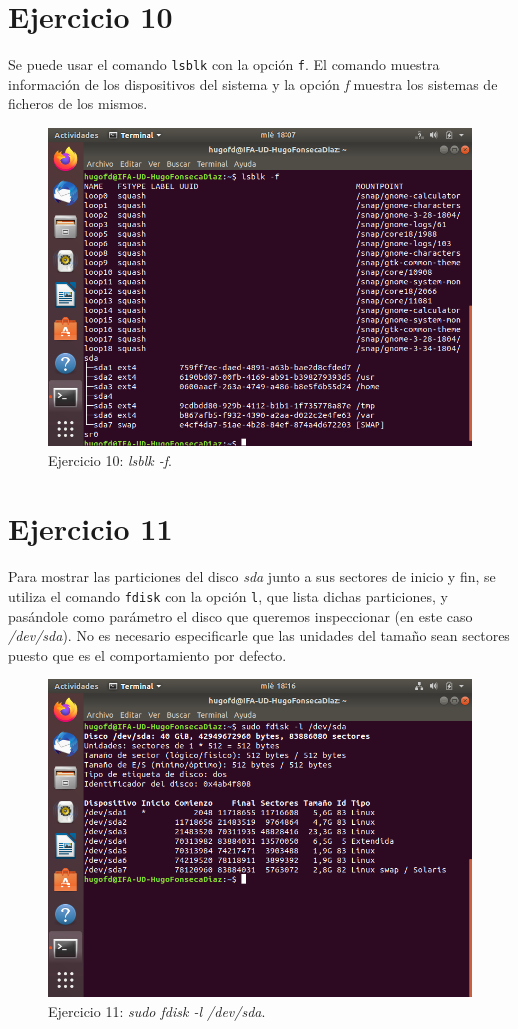 \documentclass[11pt]{article}
\begin{document}
\section{Ejercicio 10}
Se puede usar el comando \verb|lsblk| con la opción \verb|f|. El comando muestra información de los dispositivos del sistema y la opción \textit{f} muestra los sistemas de ficheros de los mismos.

\begin{figure}[H]
    \caption{Ejercicio 10: \textit{lsblk -f}.}
  \centering
  \includegraphics{e10.png}
\end{figure}

\section{Ejercicio 11}
Para mostrar las particiones del disco \textit{sda} junto a sus sectores de inicio y fin, se utiliza el comando \verb|fdisk| con la opción \verb|l|, que lista dichas particiones, y pasándole como parámetro el disco que queremos inspeccionar (en este caso \textit{/dev/sda}). No es necesario especificarle que las unidades del tamaño sean sectores puesto que es el comportamiento por defecto.

\begin{figure}[H]
    \caption{Ejercicio 11: \textit{sudo fdisk -l /dev/sda}.}
  \centering
  \includegraphics{e11.png}
\end{figure}

\begin{thebibliography}{8}
\end{thebibliography}
\end{document}
